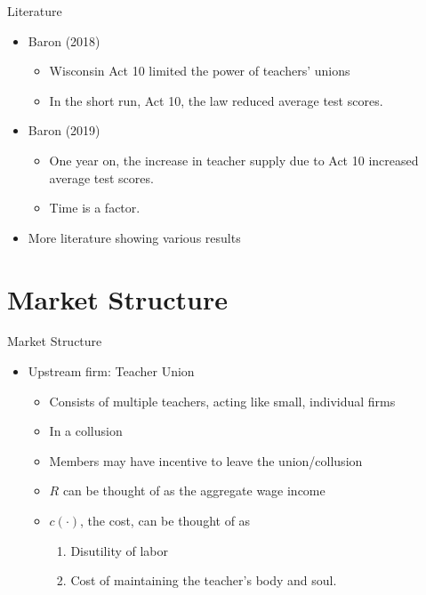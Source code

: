 \documentclass[12pt,aspectratio=169]{beamer} %
\begin{document}
\begin{frame}{Literature}

\begin{itemize}
	
	\item Baron (2018)
	\begin{itemize}
		\item Wisconsin Act 10 limited the power of teachers' unions
		\item In the short run, Act 10, the law reduced average test scores.
	\end{itemize}
	\item Baron (2019)
	\begin{itemize}
		\item One year on, the increase in teacher supply due to Act 10 increased average test scores.
		\item Time is a factor.
	\end{itemize}
	\item More literature showing various results
\end{itemize}
\end{frame}

\section{Market Structure}

\begin{frame}{Market Structure}
	\begin{itemize}
		\item Upstream firm: Teacher Union
		\begin{itemize}
			\item Consists of multiple teachers, acting like small, individual firms
			\item In a collusion
			\item Members may have incentive to leave the union/collusion
			\item $R$ can be thought of as the aggregate wage income
			\item $c\left(\cdot\right)$, the cost, can be thought of as
			\begin{enumerate}
				\item Disutility of labor
				\item Cost of maintaining the teacher's body and soul.
			\end{enumerate}
		\end{itemize}
	\end{itemize}
\end{frame}
\end{document}
